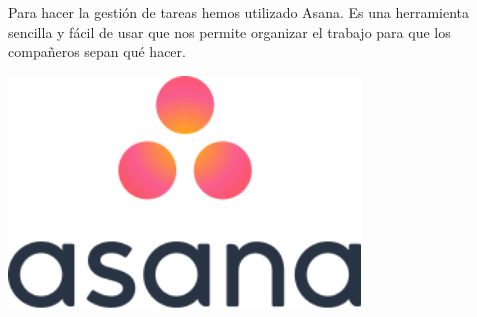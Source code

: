 \documentclass[12pt,a4paper]{article}
\begin{document}
\newpage
\begin{minipage}{.75\textwidth}
Para hacer la gestión de tareas hemos utilizado Asana. Es una herramienta sencilla y fácil de usar que nos permite organizar el trabajo para que los compañeros sepan qué hacer.\\


\end{minipage} %
\begin{minipage}{.25\textwidth}
  \includegraphics[width=0.7\textwidth, right]{asana}
\end{minipage}
\end{document}

